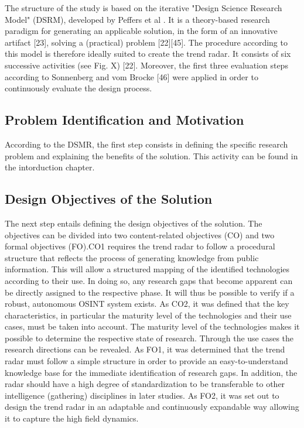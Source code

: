 \documentclass[10pt]{article}
\begin{document}
The structure of the study is based on the iterative "Design Science Research Model" (DSRM),
developed by Peffers et al \cite{Peffers.2007}. It is a theory-based research paradigm for generating an
applicable solution, in the form of an innovative artifact [23], solving a (practical)
problem [22][45]. The procedure according to this model is therefore ideally suited to
create the trend radar. It consists of six successive activities (see Fig. X) [22].
Moreover, the first three evaluation steps according to Sonnenberg and vom Brocke [46]
were applied in order to continuously evaluate the design process.

\subsection{Problem Identification and Motivation}

According to the DSMR, the first step consists in defining the
specific research problem and explaining the benefits of the solution.
This activity can be found in the intorduction chapter.

\subsection{Design Objectives of the Solution}

The next step entails defining the design objectives of the solution. The
objectives can be divided into two content-related objectives (CO) and
two formal objectives (FO).CO1 requires the trend radar to follow a procedural
structure that reflects the process of generating knowledge from
public information. This will allow a structured mapping of the
identified technologies according to their use. In doing so, any
research gaps that become apparent can be directly assigned to the
respective phase. It will thus be possible to verify if a robust,
autonomous OSINT system exists. As CO2, it was defined that the key
characteristics, in particular the maturity level of the technologies
and their use cases, must be taken into account. The maturity level of
the technologies makes it possible to determine the respective state
of research. Through the use cases the research directions can be
revealed. As FO1, it was determined that the trend radar must follow
a simple structure in order to provide an easy-to-understand knowledge
base for the immediate identification of research gaps. In addition,
the radar should have a high degree of standardization to be
transferable to other intelligence (gathering) disciplines in later
studies. As FO2, it was set out to design the trend radar in an
adaptable and continuously expandable way allowing it to capture the
high field dynamics.
\end{document}
